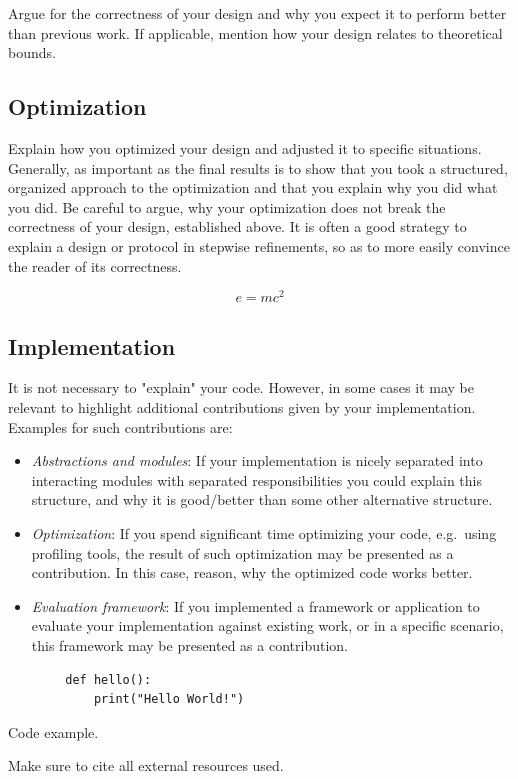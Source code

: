 Argue for the correctness of your design and why you expect it to perform better than previous work. If applicable, mention how your design relates to theoretical bounds.

\subsection{Optimization} \label{subsec:optimization}

Explain how you optimized your design and adjusted it to specific situations. Generally, as important as the final results is to show that you took a structured, organized approach to the optimization and that you explain why you did what you did. Be careful to argue, why your optimization does not break the correctness of your design, established above. It is often a good strategy to explain a design or protocol in stepwise refinements, so as to more easily convince the reader of its correctness.

\begin{equation} %
    e = mc^2
    \label{eq:equation} 
\end{equation}

\subsection{Implementation} \label{subsec:implementation}

It is not necessary to "explain" your code. However, in some cases it may be relevant to highlight additional contributions given by your implementation. Examples for such contributions are:

\begin{itemize}
    \item \emph{Abstractions and modules}: If your implementation is nicely separated into interacting modules with separated responsibilities you could explain this structure, and why it is good/better than some other alternative structure.

    \item \emph{Optimization}: If you spend significant time optimizing your code, e.g.~using profiling tools, the result of such optimization may be presented as a contribution. In this case, reason, why the optimized code works better.

    \item \emph{Evaluation framework}: If you implemented a framework or application to evaluate your implementation against existing work, or in a specific scenario, this framework may be presented as a contribution.
\end{itemize}

\begin{listing}[H] %
    \begin{verbatim}
        def hello():
            print("Hello World!")
    \end{verbatim}
    \caption{Code example.}
    \label{lst:code}
\end{listing}

Make sure to cite all external resources used.
